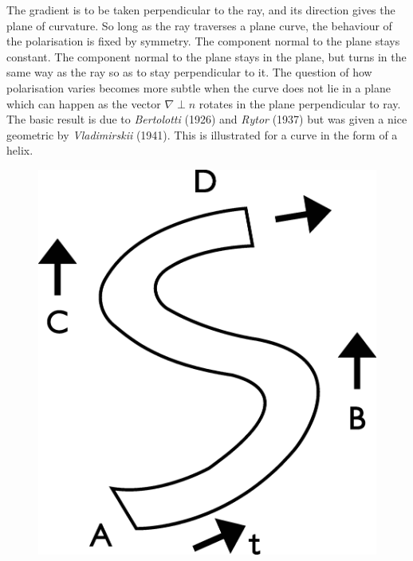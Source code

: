 The gradient is to be taken perpendicular to the ray, and its direction gives
the plane of curvature. So long as the ray traverses a plane curve, the behaviour
of the polarisation is fixed by symmetry. The component normal to the plane
stays constant. The component normal to the plane stays in the plane, but
turns in the same way as the ray so as to stay perpendicular to it. The question
of how polarisation varies becomes more subtle when the curve does not lie in
a plane which can happen as the vector $\nabla \perp n $ rotates in the plane perpendicular
to ray. The basic result is due to \textit{Bertolotti} (1926) and \textit{Rytor} (1937) but was
given a nice geometric by \textit{Vladimirskii} (1941). This is illustrated for a curve in
the form of a helix.
\begin{figure}[H]
\centering
\includegraphics[scale=0.1]{src/images/chap26/20.eps}
\end{figure}

